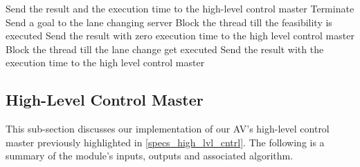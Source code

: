 \begin{itemize}
\begin{algorithm}[H]
{                Send the result and the execution time to the high-level control master\;
                Terminate\;
                }
                {Send a goal to the lane changing server\;
                Block the thread till the feasibility is executed\;
                {Send the result with zero execution time to the high level control master\;}
                {Block the thread till the lane change get executed\;
                Send the result with the execution time to the high level control master\;}
                }
                \caption{External Commands Following Algorithm}
                \label{Alg:external_cmds_follow}
            \end{algorithm}

\end{itemize}
 
\subsection{High-Level Control Master}
\label{method_high_lvl_cntrl}
This sub-section discusses our implementation of our AV's high-level control master previously highlighted in \ref{specs_high_lvl_cntrl}. The following is a summary of the module's inputs, outputs and associated algorithm.

